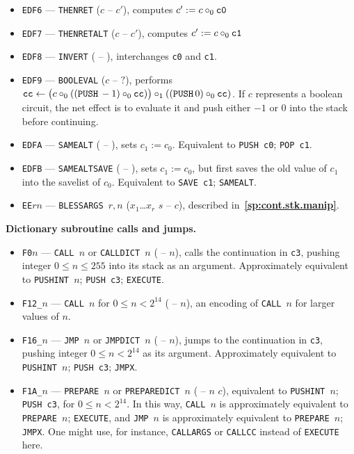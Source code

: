 \documentclass[12pt,oneside]{article}
\def\makepoint#1{\medbreak\noindent{\bf #1.\ }}
\def\nxsubpoint{\refstepcounter{subsubsection}%
    \smallbreak\makepoint{\thesubsubsection}}
\def\refpoint#1{{\rm\textbf{\ref{#1}}}}
\let\ptref=\refpoint
\def\emb#1{\textbf{#1.}}
\begin{document}
\begin{itemize}
\item {\tt EDF6} --- {\tt THENRET} ($c$ -- $c'$), computes $c':=c\circ_0{\tt c0}$
\item {\tt EDF7} --- {\tt THENRETALT} ($c$ -- $c'$), computes $c':=c\circ_0{\tt c1}$
\item {\tt EDF8} --- {\tt INVERT} ( -- ), interchanges {\tt c0} and {\tt c1}.
\item {\tt EDF9} --- {\tt BOOLEVAL} ($c$ -- $?$), performs ${\tt cc}\leftarrow \bigl(c\circ_0(({\tt PUSH}\,-1)\circ_0{\tt cc})\bigr)\circ_1(({\tt PUSH}\,0)\circ_0{\tt cc})$. If $c$ represents a boolean circuit, the net effect is to evaluate it and push either $-1$ or $0$ into the stack before continuing.
\item {\tt EDFA} --- {\tt SAMEALT} ( -- ), sets $c_1:=c_0$. Equivalent to {\tt PUSH c0}; {\tt POP c1}.
\item {\tt EDFB} --- {\tt SAMEALTSAVE} ( -- ), sets $c_1:=c_0$, but first saves the old value of $c_1$ into the savelist of $c_0$. Equivalent to {\tt SAVE c1}; {\tt SAMEALT}.
\item {\tt EE$rn$} --- {\tt BLESSARGS $r,n$} ($x_1$\dots$x_r$ $s$ -- $c$), described in~\ptref{sp:cont.stk.manip}.
\end{itemize}

\nxsubpoint\emb{Dictionary subroutine calls and jumps}\label{sp:prim.dict.calls}
\begin{itemize}
\item {\tt F0$n$} --- {\tt CALL $n$} or {\tt CALLDICT $n$} ( -- $n$), calls the continuation in {\tt c3}, pushing integer $0\leq n\leq 255$ into its stack as an argument. Approximately equivalent to {\tt PUSHINT $n$}; {\tt PUSH c3}; {\tt EXECUTE}.
\item {\tt F12\_$n$} --- {\tt CALL $n$} for $0\leq n<2^{14}$ ( -- $n$), an encoding of {\tt CALL $n$} for larger values of $n$.
\item {\tt F16\_$n$} --- {\tt JMP $n$} or {\tt JMPDICT $n$} ( -- $n$), jumps to the continuation in {\tt c3}, pushing integer $0\leq n<2^{14}$ as its argument. Approximately equivalent to {\tt PUSHINT $n$}; {\tt PUSH c3}; {\tt JMPX}.
\item {\tt F1A\_$n$} --- {\tt PREPARE $n$} or {\tt PREPAREDICT $n$} ( -- $n$ $c$), equivalent to {\tt PUSHINT $n$}; {\tt PUSH c3}, for $0\leq n<2^{14}$. In this way, {\tt CALL $n$} is approximately equivalent to {\tt PREPARE $n$}; {\tt EXECUTE}, and {\tt JMP $n$} is approximately equivalent to {\tt PREPARE $n$}; {\tt JMPX}. One might use, for instance, {\tt CALLARGS} or {\tt CALLCC} instead of {\tt EXECUTE} here.
\end{itemize}
\end{document}
